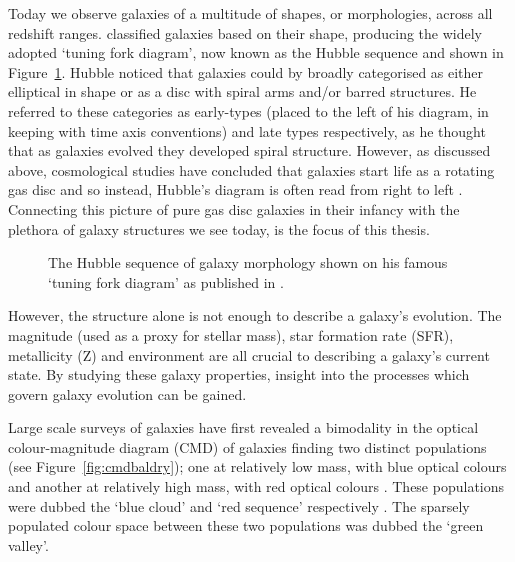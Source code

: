 Today we observe galaxies of a multitude of shapes, or morphologies, across all redshift ranges. \cite{hubble36} classified galaxies based on their shape, producing the widely adopted `tuning fork diagram', now known as the Hubble sequence and shown in Figure~\ref{fig:hubble}. Hubble noticed that galaxies could by broadly categorised as either elliptical in shape or as a disc with spiral arms and/or barred structures. He referred to these categories as early-types (placed to the left of his diagram, in keeping with time axis conventions) and late types respectively, as he thought that as galaxies evolved they developed spiral structure. However, as discussed above, cosmological studies have concluded that galaxies start life as a rotating gas disc and so instead, Hubble's diagram is often read from right to left \citep[with some debate over the placement of the S0 galaxies in this picture;][]{kormendy96}. Connecting this picture of pure gas disc galaxies in their infancy with the plethora of galaxy structures we see today, is the focus of this thesis. 

\begin{figure}
\caption[The Hubble sequence for morphological classification of galaxies]{The Hubble sequence of galaxy morphology shown on his famous `tuning fork diagram' as published in \cite{hubble36}.}
\label{fig:hubble}
\end{figure}

However, the structure alone is not enough to describe a galaxy's evolution. The magnitude (used as a proxy for stellar mass), star formation rate (SFR), metallicity (Z) and environment are all crucial to describing a galaxy's current state. By studying these galaxy properties, insight into the processes which govern galaxy evolution can be gained.

Large scale surveys of galaxies have first revealed a bimodality in the optical colour-magnitude diagram (CMD) of galaxies finding two distinct populations (see Figure~\ref{fig:cmdbaldry}); one at relatively low mass, with blue optical colours and another at relatively high mass, with red optical colours \citep{Baldry04, Baldry06, Willmer06, ball08, Brammer09}. These populations were dubbed the `blue cloud' and `red sequence' respectively \citep{Chester64, bower92, Bell04, Driver06, Faber07}.  The sparsely populated colour space between these two populations was dubbed the  `green valley'.

